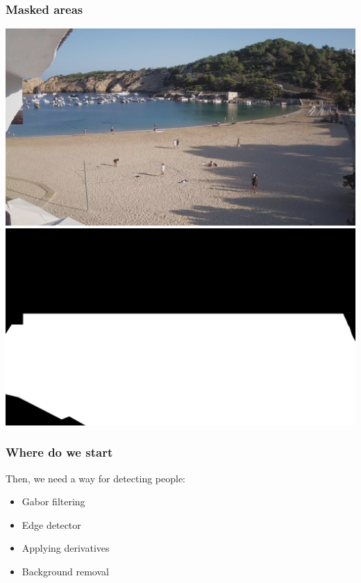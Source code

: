 \documentclass{beamer}
\begin{document}
\begin{frame}
    \frametitle{Masked areas}

    \centering

    \includegraphics[width=\textwidth,]{../Gelabert/1660287600.jpg}
    \vspace*{-6.25cm}
   { \includegraphics[width=\textwidth,]{../mask.png}}

\end{frame}


\begin{frame}
    \frametitle{Where do we start}
    Then, we need a way for detecting people:
    \begin{itemize}
        \item<2-> Gabor filtering  
        \item<3-> Edge detector  
        \item<4-> Applying derivatives 
        \item<5-> Background removal  {\color{green} \checkmark}
    \end{itemize}
     
\end{frame}
\end{document}
